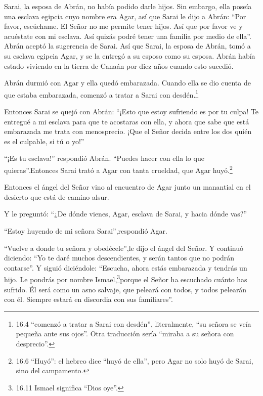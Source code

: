  Sarai, la esposa de Abrán, no había podido darle hijos. Sin
embargo, ella poseía una esclava egipcia cuyo nombre era Agar,
 así que Sarai le dijo a Abrán: ``Por favor, escúchame. El
Señor no me permite tener hijos. Así que por favor ve y acuéstate con mi
esclava. Así quizás podré tener una familia por medio de ella''. Abrán
aceptó la sugerencia de Sarai.  Así que Sarai, la esposa de
Abrán, tomó a su esclava egipcia Agar, y se la entregó a su esposo como
su esposa. Abrán había estado viviendo en la tierra de Canaán por diez
años cuando esto sucedió.

 Abrán durmió con Agar y ella quedó embarazada. Cuando ella
se dio cuenta de que estaba embarazada, comenzó a tratar a Sarai con
desdén.\footnote{16.4 ``comenzó a tratar a Sarai con desdén'',
  literalmente, ``su señora se veía pequeña ante sus ojos''. Otra
  traducción sería ``miraba a su señora con desprecio''.}

 Entonces Sarai se quejó con Abrán: ``¡Esto que estoy
sufriendo es por tu culpa! Te entregué a mi esclava para que te
acostaras con ella, y ahora que sabe que está embarazada me trata con
menosprecio. ¡Que el Señor decida entre los dos quién es el culpable, si
tú o yo!''

 ``¡Es tu esclava!'' respondió Abrán. ``Puedes hacer con
ella lo que quieras''.Entonces Sarai trató a Agar con tanta crueldad,
que Agar huyó.\footnote{16.6 ``Huyó'': el hebreo dice ``huyó de ella'',
  pero Agar no solo huyó de Sarai, sino del campamento.}

 Entonces el ángel del Señor vino al encuentro de Agar junto
un manantial en el desierto que está de camino alsur.

 Y le preguntó: ``¿De dónde vienes, Agar, esclava de Sarai,
y hacia dónde vas?''

``Estoy huyendo de mi señora Sarai'',respondió Agar.

 ``Vuelve a donde tu señora y obedécele'',le dijo el ángel
del Señor.  Y continuó diciendo: ``Yo te daré muchos
descendientes, y serán tantos que no podrán contarse''.  Y
siguió diciéndole: ``Escucha, ahora estás embarazada y tendrás un hijo.
Le pondrás por nombre Ismael,\footnote{16.11 Ismael significa ``Dios
  oye''.}porque el Señor ha escuchado cuánto has sufrido. 
Él será como un asno salvaje, que peleará con todos, y todos pelearán
con él. Siempre estará en discordia con sus familiares''.

